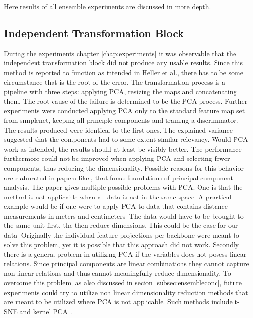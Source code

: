 Here results of all ensemble experiments are discussed in more depth. 

\subsection{Independent Transformation Block}
\label{subsec:ITBfaildiscussion}

During the experiments chapter \ref{chap:experiments} it was observable that the independent transformation block \cite{EnsembleHeller2023} did not produce any usable results. 
Since this method is reported to function as intended in Heller et al., there has to be some circumstance that is the root of the error. The transformation process is a 
pipeline with three steps: applying PCA, resizing the maps and concatenating them. \newline
The root cause of the failure is determined to be the PCA process. Further experiments were conducted applying PCA only to the standard feature map set from simplenet, 
keeping all principle components and training 
a discriminator. The results produced were identical to the first ones. The explained variance suggested that the components had to some extent similar relevancy. Would PCA 
work as intended, the results should at least be visibly better. The performance furthermore could not be improved when applying PCA and selecting fewer components, thus reducing 
the dimensionality. Possible reasons for this behavior are elaborated in papers like \cite{Jolliffe_2016PCAbasics}, that focus foundations of principal component analysis. 
The paper gives multiple possible problems with PCA. One is that the method is not applicable when all data is not in the same space. A practical example would be if one were to 
apply PCA to data that contains distance measurements in meters and centimeters. The data would have to be brought to the same unit first, the then reduce dimensions. This could 
be the case for our data. Originally the individual feature projections per backbone were meant to solve this problem, yet it is possible that this approach did not work. 
Secondly there is a general problem in utilizing PCA if the variables does not posess linear relations. Since principal components are linear combinations \cite{Jolliffe_2016PCAbasics} 
they cannot capture non-linear relations and thus cannot meaningfully reduce dimensionality. To overcome this problem, as also discussed in secion \ref{subsec:ensembleconc}, 
future experiments could try to utilize non linear dimensionality reduction methods that are meant to be utilized where PCA is not applicable. Such methods include t-SNE \cite{tSNE} 
and kernel PCA \cite{Hoffmann_2007kernelPCA}.



